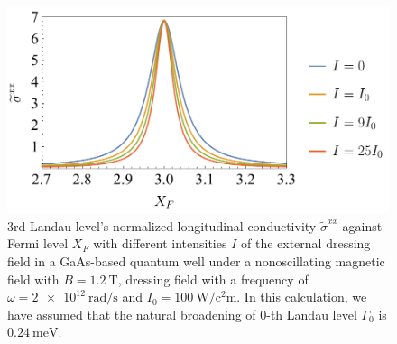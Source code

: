 \begin{figure}[t]
\includegraphics[scale=0.54]{figures/fig_5}
\caption{$3$rd Landau level’s normalized longitudinal conductivity $\widetilde{\sigma}^{xx}$ against Fermi level $X_F$ with different intensities $I$ of the external dressing field in a GaAs-based quantum well under a nonoscillating magnetic field with $B = \SI{1.2}{\tesla}$, dressing field with a frequency of $\omega =\SI{2e12}{\radian\per\second}$ and $I_0 =\SI{100}{\watt\per\square\centi\metre}$.
In this calculation, we have assumed that the natural  broadening of $0$-th Landau level $\Gamma_0$ is $\SI{0.24}{\milli\eV}$.}
\label{fig:6}
\end{figure}
